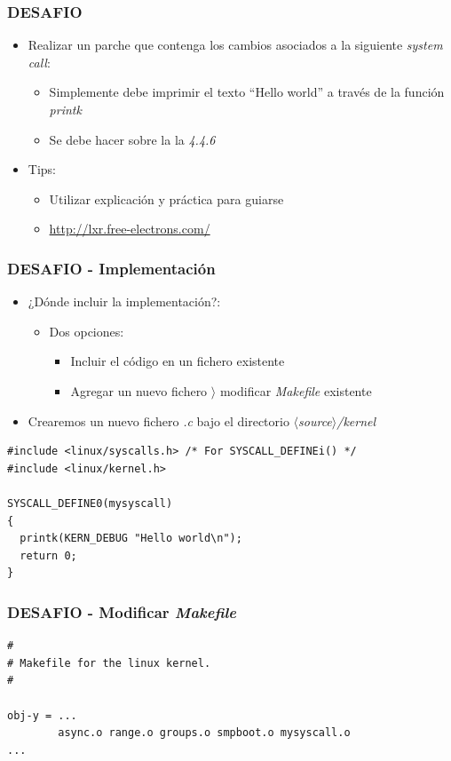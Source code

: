 \begin{frame}
\frametitle{DESAFIO}
   \begin{itemize}  
   \item Realizar un parche que contenga los cambios asociados a la siguiente \textit{system call}: 
   \begin{itemize}
      \item Simplemente debe imprimir el texto ``Hello world'' a través de la función \textit{printk}
      \item Se debe hacer sobre la la \emph{4.4.6}
    \end{itemize}
    \item Tips:
    \begin{itemize}
      \item Utilizar explicación y práctica para guiarse      
      \item \url{http://lxr.free-electrons.com/}
    \end{itemize}
 \end{itemize}
\end{frame}

\begin{frame}[fragile]
\frametitle{DESAFIO - Implementación}
  \begin{itemize}
    \item ¿Dónde incluir la implementación?:
    \begin{itemize}
      \item Dos opciones:
      \begin{itemize}
        \item Incluir el código en un fichero existente
        \item Agregar un nuevo fichero $\rangle$ modificar \emph{Makefile} existente
      \end{itemize}
    \end{itemize}
    \item Crearemos un nuevo fichero \emph{.c} bajo el directorio \emph{$\langle$source$\rangle$/kernel}
  \end{itemize}
  \begin{lstlisting}
#include <linux/syscalls.h> /* For SYSCALL_DEFINEi() */
#include <linux/kernel.h>

SYSCALL_DEFINE0(mysyscall)
{
  printk(KERN_DEBUG "Hello world\n");
  return 0;
}      
  \end{lstlisting}
\end{frame}

\begin{frame}[fragile]
\frametitle{DESAFIO - Modificar \emph{Makefile}}
  \begin{lstlisting}
#
# Makefile for the linux kernel.
#

obj-y = ...
        async.o range.o groups.o smpboot.o mysyscall.o
...
  \end{lstlisting}  
\end{frame}

